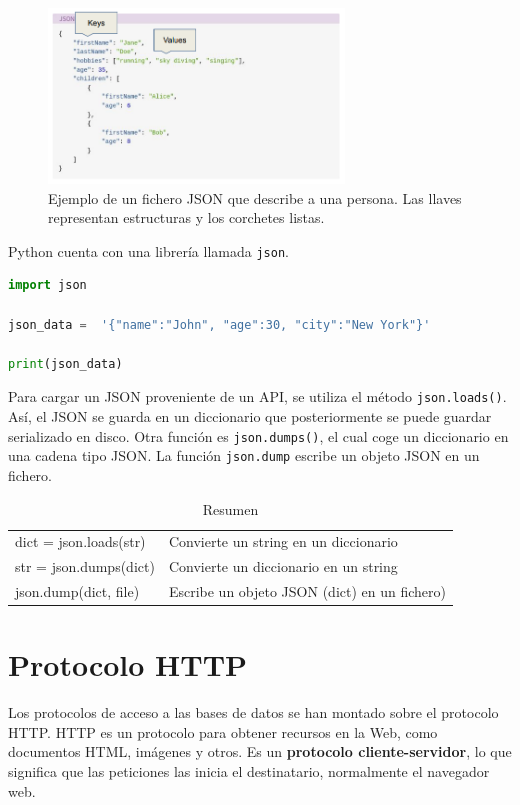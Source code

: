 \begin{figure}[htbp]
\centering
\includegraphics[width = 0.7\textwidth]{figs/json.png}
\caption{Ejemplo de un fichero JSON que describe a una persona. Las llaves representan estructuras y los corchetes listas.}
\label{fig:json}
\end{figure}

Python cuenta con una librería llamada \texttt{json}.
\begin{lstlisting}[language=Python]
import json

json_data =  '{"name":"John", "age":30, "city":"New York"}'

print(json_data)
\end{lstlisting}

Para cargar un JSON proveniente de un API, se utiliza el método \texttt{json.loads()}. Así, el JSON se guarda en un diccionario que posteriormente se puede guardar serializado en disco. Otra función es \texttt{json.dumps()}, el cual coge un diccionario en una cadena tipo JSON. La función \texttt{json.dump} escribe un objeto JSON en un fichero. 

\begin{table}[htbp]
\centering
\begin{tabular}{l | l}
dict = json.loads(str) & Convierte un string en un diccionario \\
str = json.dumps(dict) & Convierte un diccionario en un string \\
json.dump(dict, file) & Escribe un objeto JSON (dict) en un fichero)
\end{tabular}
\caption{Resumen}
\end{table}

\section{Protocolo HTTP}
Los protocolos de acceso a las bases de datos se han montado sobre el protocolo HTTP. HTTP es un protocolo para obtener recursos en la Web, como documentos HTML, imágenes y otros. Es un \textbf{protocolo cliente-servidor}, lo que significa que las peticiones las inicia el destinatario, normalmente el navegador web. 

